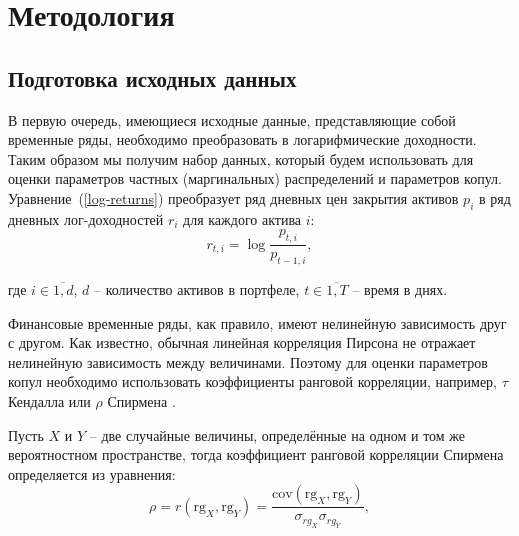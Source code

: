 \section{Методология}
\label{section:methodology}


\subsection{Подготовка исходных данных} 
\label{methodology:preparing}

В первую очередь, имеющиеся исходные данные, представляющие собой временные ряды, необходимо преобразовать в логарифмические доходности. 
Таким образом мы получим %
набор данных, который %
будем использовать для оценки параметров %
частных (маргинальных) распределений и параметров копул. Уравнение~(\ref{log-returns}) преобразует ряд дневных цен закрытия активов $p_i$ в ряд дневных лог-доходностей $r_i$ для каждого актива $i$:
%
\begin{equation}\label{log-returns}
r_{t,i}=\log \frac{p_{t,i}}{p_{t-1,i}},
\end{equation}

\noindent где $i \in \overline{1, d}$, $d$ -- количество активов в портфеле, $t\in \overline{1, T}$ -- время в днях.

Финансовые временные ряды, %
как правило, имеют нелинейную зависимость друг с другом.
Как известно, обычная линейная корреляция Пирсона не отражает нелинейную зависимость между величинами.
Поэтому для оценки параметров копул необходимо использовать коэффициенты ранговой корреляции, например, $\tau$ Кендалла \cite{Kendall1970} или $\rho$ Спирмена \cite{Mye2003}.

Пусть $X$ и $Y$ -- две случайные величины, определённые на одном и том же вероятностном пространстве, %
тогда коэффициент ранговой корреляции Спирмена %
определяется из уравнения:
%
\begin{equation}\label{spearman}
\rho = r(\text{rg}_X, \text{rg}_Y) = \frac{\text{cov}(\text{rg}_{X},\text{rg}_{Y})}{\sigma_{rg_X} \sigma_{rg_Y}},
\end{equation}

